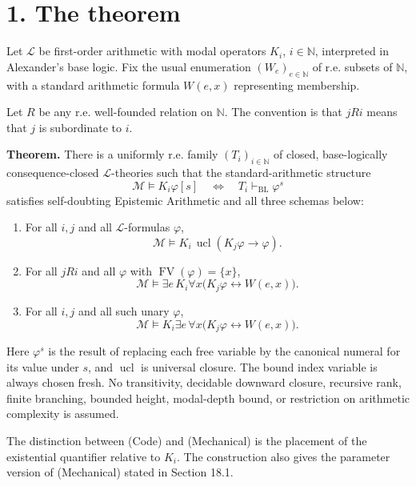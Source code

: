 \documentclass[
  11pt,
  letterpaper,
]{article}
\begin{document}
\section{1. The theorem}\label{the-theorem}

Let \(\mathcal L\) be first-order arithmetic with modal operators
\(K_i\), \(i\in\mathbb N\), interpreted in Alexander's base logic. Fix
the usual enumeration \((W_e)_{e\in\mathbb N}\) of r.e. subsets of
\(\mathbb N\), with a standard arithmetic formula \(W(e,x)\)
representing membership.

Let \(R\) be any r.e. well-founded relation on \(\mathbb N\). The
convention is that \(jRi\) means that \(j\) is subordinate to \(i\).

\textbf{Theorem.} There is a uniformly r.e. family
\((T_i)_{i\in\mathbb N}\) of closed, base-logically consequence-closed
\(\mathcal L\)-theories such that the standard-arithmetic structure \[
\mathcal M\models K_i\varphi[s]
\quad\Longleftrightarrow\quad
T_i\vdash_{\mathrm{BL}}\varphi^s
\tag{T}
\] satisfies self-doubting Epistemic Arithmetic and all three schemas
below:

\begin{enumerate}
\def\labelenumi{\arabic{enumi}.}
\item
  For all \(i,j\) and all \(\mathcal L\)-formulas \(\varphi\), \[
  \mathcal M\models
  K_i\,\operatorname{ucl}(K_j\varphi\to\varphi).
  \tag{Truth}
  \]
\item
  For all \(jRi\) and all \(\varphi\) with
  \(\operatorname{FV}(\varphi)=\{x\}\), \[
  \mathcal M\models
  \exists e\,K_i\forall x
     \bigl(K_j\varphi\leftrightarrow W(e,x)\bigr).
  \tag{Code}
  \]
\item
  For all \(i,j\) and all such unary \(\varphi\), \[
  \mathcal M\models
  K_i\exists e\,\forall x
     \bigl(K_j\varphi\leftrightarrow W(e,x)\bigr).
  \tag{Mechanical}
  \]
\end{enumerate}

Here \(\varphi^s\) is the result of replacing each free variable by the
canonical numeral for its value under \(s\), and \(\operatorname{ucl}\)
is universal closure. The bound index variable is always chosen fresh.
No transitivity, decidable downward closure, recursive rank, finite
branching, bounded height, modal-depth bound, or restriction on
arithmetic complexity is assumed.

The distinction between (Code) and (Mechanical) is the placement of the
existential quantifier relative to \(K_i\). The construction also gives
the parameter version of (Mechanical) stated in Section 18.1.
\end{document}
